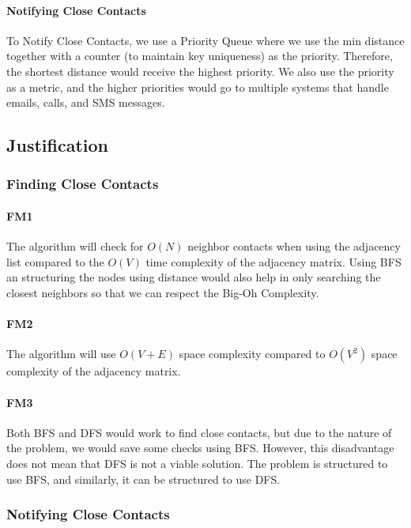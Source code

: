 \documentclass{article}
\begin{document}
\paragraph{Notifying Close Contacts}

To Notify Close Contacts, we use a Priority Queue where we use the min distance together with a counter (to maintain key uniqueness) as the priority. Therefore, the shortest distance would receive the highest priority. We also use the priority as a metric, and the higher priorities would go to multiple systems that handle emails, calls, and SMS messages. 

\subsection{Justification}

\subsubsection{Finding Close Contacts}

\paragraph{FM1}

The algorithm will check for $O(N)$ neighbor contacts when using the adjacency list compared to the $O(V)$ time complexity of the adjacency matrix. Using BFS an structuring the nodes using distance would also help in only searching the closest neighbors so that we can respect the Big-Oh Complexity.

\paragraph{FM2}

The algorithm will use $O(V + E)$ space complexity compared to $O(V^2)$ space complexity of the adjacency matrix.

\paragraph{FM3}

Both BFS and DFS would work to find close contacts, but due to the nature of the problem, we would save some checks using BFS. However, this disadvantage does not mean that DFS is not a viable solution. The problem is structured to use BFS, and similarly, it can be structured to use DFS. 

\subsubsection{Notifying Close Contacts}
\end{document}
